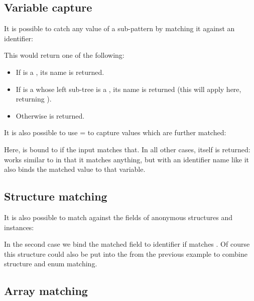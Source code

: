 \subsection{Variable capture}
\label{lf-pattern-matching-variable-capture}

It is possible to catch any value of a sub-pattern by matching it against an identifier:


This would return one of the following:

\begin{itemize}
	\item If  is a , its name is returned.
	\item If  is a  whose left sub-tree is a , its name is returned (this will apply here, returning ).
	\item Otherwise  is returned.
\end{itemize}

It is also possible to use = to capture values which are further matched:


Here,  is bound to  if the input matches that. In all other cases,  itself is returned:  works similar to  in that it matches anything, but with an identifier name like  it also binds the matched value to that variable.

\subsection{Structure matching}
\label{lf-pattern-matching-structure}

It is also possible to match against the fields of anonymous structures and instances:


In the second case we bind the matched  field to identifier  if  matches . Of course this structure could also be put into the  from the previous example to combine structure and enum matching.

\subsection{Array matching}
\label{lf-pattern-matching-array}

